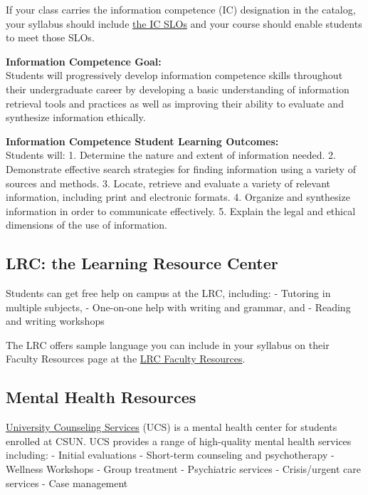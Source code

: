 \documentclass[
  letterpaper,
  DIV=11,
  numbers=noendperiod]{scrartcl}
\begin{document}
If your class carries the information competence (IC) designation in the
catalog, your syllabus should include
\href{https://catalog.csun.edu}{the IC SLOs} and your course should
enable students to meet those SLOs.

\textbf{Information Competence Goal:}\\
Students will progressively develop information competence skills
throughout their undergraduate career by developing a basic
understanding of information retrieval tools and practices as well as
improving their ability to evaluate and synthesize information
ethically.

\textbf{Information Competence Student Learning Outcomes:}\\
Students will: 1. Determine the nature and extent of information needed.
2. Demonstrate effective search strategies for finding information using
a variety of sources and methods. 3. Locate, retrieve and evaluate a
variety of relevant information, including print and electronic formats.
4. Organize and synthesize information in order to communicate
effectively. 5. Explain the legal and ethical dimensions of the use of
information.

\subsection{LRC: the Learning Resource
Center}\label{lrc-the-learning-resource-center}

Students can get free help on campus at the LRC, including: - Tutoring
in multiple subjects, - One-on-one help with writing and grammar, and -
Reading and writing workshops

The LRC offers sample language you can include in your syllabus on their
Faculty Resources page at the
\href{https://www.csun.edu/undergraduate-studies/learning-resource-center/faculty-resources}{LRC
Faculty Resources}.

\subsection{Mental Health Resources}\label{mental-health-resources}

\href{https://www.csun.edu}{University Counseling Services} (UCS) is a
mental health center for students enrolled at CSUN. UCS provides a range
of high-quality mental health services including: - Initial evaluations
- Short-term counseling and psychotherapy - Wellness Workshops - Group
treatment - Psychiatric services - Crisis/urgent care services - Case
management
\end{document}
